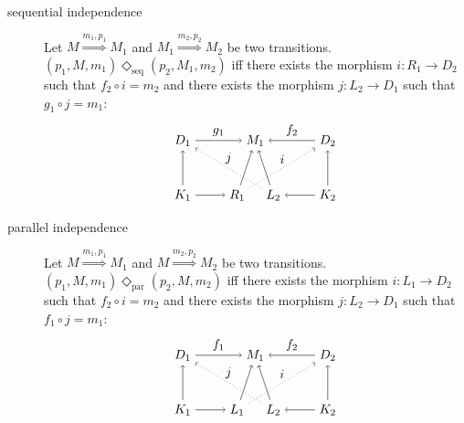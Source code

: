 \begin{definition}
  \label{def:indep}
  $~$
  \begin{description}
  \item[sequential independence]
    Let $M\overset{m_1,p_1}{\Rightarrow} M_1$ and $M_1\overset{m_2,p_2}{\Rightarrow} M_2$ be two transitions.
    $(p_1,M,m_1) \Diamond_{\text{seq}} (p_2,M_1,m_2)$ iff there exists the morphism $i:R_1\to D_2$ such that $f_2\circ i= m_2$ and there exists the morphism $j:L_2\to D_1$ such that $g_1\circ j= m_1$:
    \[
    \begin{tikzpicture} %
    \node (r1) at (1.5,0) {\(R_1\)};
    \node (m1) at (2,1.5) {\(M_1\)};
    \node (l2) at (2.5,0) {\(L_2\)};
    \node (d1) at (0,1.5) {\(D_1\)};
    \node (k1) at (0,0) {\(K_1\)};
    \node (d2) at (4,1.5) {\(D_2\)};
    \node (k2) at (4,0) {\(K_2\)};
    \draw [->] (k1) -- (r1);
    \draw [->] (k2) -- (l2);
    \draw [->] (k1) -- (d1);
    \draw [->] (k2) -- (d2);
    \draw [->] (d1) -- node [above,midway] {\(g_1\)} (m1);
    \draw [->] (d2) -- node [above,midway] {\(f_2\)} (m1);
    \draw [->] (l2) -- (m1);
    \draw [->] (r1) -- (m1);
    \draw [dotted,->] (r1) -- node [above,midway] {\(i\)} (d2);
    \draw [dotted,->] (l2) -- node [above,midway] {\(j\)} (d1);
    \end{tikzpicture}
    \]
  \item[parallel independence]
    Let $M\overset{m_1,p_1}{\Rightarrow} M_1$ and $M\overset{m_2,p_2}{\Rightarrow} M_2$ be two transitions.
    $(p_1,M,m_1) \Diamond_{\text{par}} (p_2,M,m_2)$ iff there exists the morphism $i:L_1\to D_2$ such that $f_2\circ i= m_2$ and there exists the morphism $j:L_2\to D_1$ such that $f_1\circ j= m_1$:
    \[
    \begin{tikzpicture} %
    \node (r1) at (1.5,0) {\(L_1\)};
    \node (m1) at (2,1.5) {\(M_1\)};
    \node (l2) at (2.5,0) {\(L_2\)};
    \node (d1) at (0,1.5) {\(D_1\)};
    \node (k1) at (0,0) {\(K_1\)};
    \node (d2) at (4,1.5) {\(D_2\)};
    \node (k2) at (4,0) {\(K_2\)};
    \draw [->] (k1) -- (r1);
    \draw [->] (k2) -- (l2);
    \draw [->] (k1) -- (d1);
    \draw [->] (k2) -- (d2);
    \draw [->] (d1) -- node [above,midway] {\(f_1\)} (m1);
    \draw [->] (d2) -- node [above,midway] {\(f_2\)} (m1);
    \draw [->] (l2) -- (m1);
    \draw [->] (r1) -- (m1);
    \draw [dotted,->] (r1) -- node [above,midway] {\(i\)} (d2);
    \draw [dotted,->] (l2) -- node [above,midway] {\(j\)} (d1);
    \end{tikzpicture}
    \]
  \end{description}

\end{definition}

